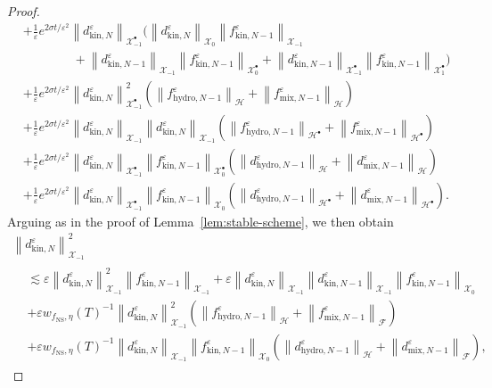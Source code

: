 \documentclass[10pt]{amsart}
\theoremstyle{definition}\newtheorem{defi}[theo]{Definition}\newtheorem{rema}[theo]{Remark}\newtheorem{exam}[theo]{Example}\newtheorem{exem}[theo]{Example}\newtheorem{nota}[theo]{Notation}
\newcommand{\ns}{\mathrm{NS}}
\newcommand{\hyd}{\mathrm{hydro}}
\newcommand{\mix}{\mathrm{mix}}
\newcommand{\kin}{\mathrm{kin}}
\newcommand{\XX}{\mathcal{X}}
\newcommand{\HH}{\mathcal{H}}
\newcommand{\FFF}{\mathscr{F}}
\newcommand{\HHH}{\mathscr{H}}
\newcommand{\GGG}{\mathscr{X}}
\newcommand{\SSs}{\HH}
\newcommand{\SSsp}{\HH^{\bullet}}
\newcommand{\SSSs}{\HHH}
\newcommand{\SSh}{\bm{\XX}}
\newcommand{\SShp}{\bm{\XX}^{\bullet}}
\newcommand{\SSSh}{\pmb{\GGG}}
\newcommand{\SSSm}{\FFF}
\newcommand*\eps{{\varepsilon}}
\begin{document}
\begin{proof}
\begin{align*}
&+ \frac{1}{\eps} e^{2 \sigma t / \eps^2} \left\| d^\eps_{\kin, N} \right\|_{\SShp_{-1}} \Bigg(\left\| d^\eps_{\kin, N} \right\|_{\SSh_{0}} \left\| f^\eps_{\kin, N-1}\right\|_{\SSh_{-1}} \\
&\phantom{++++} + \left\| d^\eps_{\kin, N-1}\right\|_{\SSh_{-1}} \left\| f^\eps_{\kin, N-1}\right\|_{\SShp_{0}} + \left\| d^\eps_{\kin, N-1}\right\|_{\SShp_{-1}} \left\| f^\eps_{\kin, N-1}\right\|_{\SShp_{1}} \Bigg)\\
& + \frac{1}{\eps} e^{2 \sigma t / \eps^2} \left\| d^\eps_{\kin, N}\right\|_{ \SShp_{-1} }^2 \left(\left\| f^\eps_{\hyd, N-1}\right\|_{ \SSs } + \left\| f^\eps_{\mix, N-1}\right\|_{ \SSs } \right)
\\
& + \frac{1}{\eps} e^{2 \sigma t / \eps^2}\left\| d^\eps_{\kin, N}\right\|_{ \SSh_{-1} }
\left\| d^\eps_{\kin, N}\right\|_{ \SSh_{-1} } \left(\left\| f^\eps_{\hyd, N-1}\right\|_{ \SSsp } + \left\| f^\eps_{\mix, N-1}\right\|_{ \SSsp } \right) \\
& + \frac{1}{\eps} e^{2 \sigma t / \eps^2} \left\| d^\eps_{\kin, N}\right\|_{\SShp_{-1} }\left\| f^\eps_{\kin, N-1}\right\|_{ \SShp_{0} } \left(\left\| d^\eps_{\hyd, N-1}\right\|_{ \SSs } + \left\| d^\eps_{\mix, N-1}\right\|_{ \SSs } \right)
\\
& + \frac{1}{\eps} e^{2 \sigma t / \eps^2}\left\| d^\eps_{\kin, N}\right\|_{ \SShp_{-1} } 
\left\| f^\eps_{\kin, N-1}\right\|_{ \SSh_{0} } \left(\left\| d^\eps_{\hyd, N-1}\right\|_{ \SSsp } + \left\| d^\eps_{\mix, N-1}\right\|_{ \SSsp } \right).
\end{align*}\endgroup
Arguing as in the proof of Lemma~\ref{lem:stable-scheme}, we then obtain
\begin{multline*}
\left\| d^\eps_{\kin, N} \right\|^2_{ \SSSh_{-1} }
\\
\begin{aligned}
&\lesssim \eps \left\| d^\eps_{\kin, N} \right\|_{\SSSh_{-1}}^2 \left\| f^\eps_{\kin, N-1} \right\|_{\SSSh_{-1} } + \eps \left\| d^\eps_{\kin, N} \right\|_{\SSSh_{-1}} \left\| d^\eps_{\kin, N-1} \right\|_{\SSSh_{-1}} \left\| f^\eps_{\kin, N-1} \right\|_{ \SSSh_{0} } \\
& + \eps w_{ f_\ns, \eta }(T)^{-1} \left\| d^\eps_{\kin, N} \right\|_{\SSSh_{-1}}^2 \left(\left\| f^\eps_{\hyd, N-1} \right\|_\SSSs + \left\| f^\eps_{\mix, N-1} \right\|_\SSSm \right) \\
& + \eps w_{ f_\ns, \eta }(T)^{-1} \left\| d^\eps_{\kin, N} \right\|_{\SSSh_{-1}} \left\| f^\eps_{\kin, N-1} \right\|_{\SSSh_{0}} \left(\left\| d^\eps_{\hyd, N-1} \right\|_\SSSs + \left\| d^\eps_{\mix, N-1} \right\|_\SSSm \right),

\end{aligned}
\end{multline*}
\end{proof}
\end{document}
